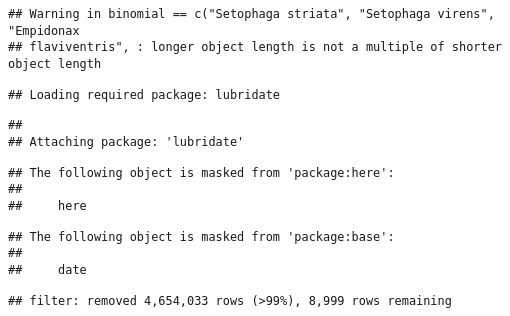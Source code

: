 \documentclass[
]{article}
\begin{document}
\begin{verbatim}
## Warning in binomial == c("Setophaga striata", "Setophaga virens", "Empidonax
## flaviventris", : longer object length is not a multiple of shorter object length
\end{verbatim}

\begin{verbatim}
## Loading required package: lubridate
\end{verbatim}

\begin{verbatim}
## 
## Attaching package: 'lubridate'
\end{verbatim}

\begin{verbatim}
## The following object is masked from 'package:here':
## 
##     here
\end{verbatim}

\begin{verbatim}
## The following object is masked from 'package:base':
## 
##     date
\end{verbatim}

\begin{verbatim}
## filter: removed 4,654,033 rows (>99%), 8,999 rows remaining
\end{verbatim}
\end{document}

